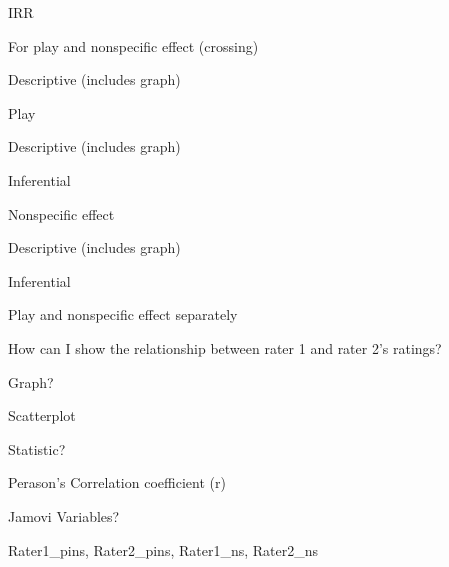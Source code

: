 \begin{coloredlist}
    \item IRR
    \begin{coloredlist}
        \item For play and nonspecific effect (crossing)
        \item Descriptive (includes graph)
    \end{coloredlist}
    \item Play
    \begin{coloredlist}
        \item Descriptive (includes graph)
        \item Inferential
    \end{coloredlist}
    \item Nonspecific effect
    \begin{coloredlist}
        \item Descriptive (includes graph)
        \item Inferential
    \end{coloredlist}
    \item Play and nonspecific effect separately
    \item How can I show the relationship between rater 1 and rater 2's ratings?
    \begin{coloredlist}
        \item Graph?
        \begin{coloredlist}
            \item Scatterplot
        \end{coloredlist}
        \item Statistic?
        \begin{coloredlist}
            \item Perason's Correlation coefficient (r)
        \end{coloredlist}
        \item Jamovi Variables?
        \begin{coloredlist}
            \item Rater1\_pins, Rater2\_pins, Rater1\_ns, Rater2\_ns
        \end{coloredlist}
    \end{coloredlist}
\end{coloredlist}
